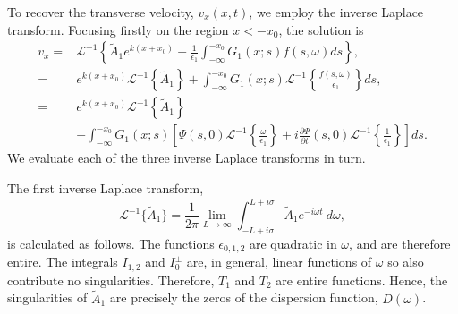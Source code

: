 \documentclass[12pt]{../style-files/ociamthesis}
\begin{document}
To recover the transverse velocity, $v_x(x, t)$, we employ the inverse Laplace transform. Focusing firstly on the region $x < -x_0$, the solution is
\newcommand{\e}{\epsilon}
\begin{align}
v_x =& \mathcal{L}^{-1} \left\{ \tilde{A}_1 e^{k(x+x_0)} + \frac{1}{\e_1} \int_{-\infty}^{-x_0} G_1(x;s)f(s, \omega)ds \right\}, \\
=& e^{k(x+x_0)} \mathcal{L}^{-1}\left\{ \tilde{A}_1 \right\} + \int_{-\infty}^{-x_0} G_1(x;s) \mathcal{L}^{-1}\left\{ \frac{f(s, \omega)}{\e_1} \right\} ds, \\
=& e^{k(x+x_0)} \mathcal{L}^{-1}\left\{ \tilde{A}_1 \right\} \\
& + \int_{-\infty}^{-x_0} G_1(x;s) \left[ \Psi (s, 0) \mathcal{L}^{-1}\left\{ \frac{\omega}{\e_1} \right\} + i \frac{\partial \Psi}{\partial t}(s, 0) \mathcal{L}^{-1}\left\{ \frac{1}{\e_1} \right\}\right] ds.
\label{sol incomp}
\end{align}
We evaluate each of the three inverse Laplace transforms in turn.

The first inverse Laplace transform,
\begin{equation}
\mathcal{L}^{-1} \{\tilde{A}_1\} = \frac{1}{2\pi} \lim_{L \to \infty} \int_{-L + i\sigma}^{L + i\sigma} \tilde{A}_1 e^{-i\omega t} ~d\omega,
\end{equation}
is calculated as follows. The functions $\epsilon_{0,1,2}$ are quadratic in $\omega$, and are therefore entire. The integrals $I_{1,2}$ and $I_0^\pm$ are, in general, linear functions of $\omega$ so also contribute no singularities. Therefore, $T_1$ and $T_2$ are entire functions. Hence, the singularities of $\tilde{A}_1$ are precisely the zeros of the dispersion function, $D(\omega)$.
\end{document}
